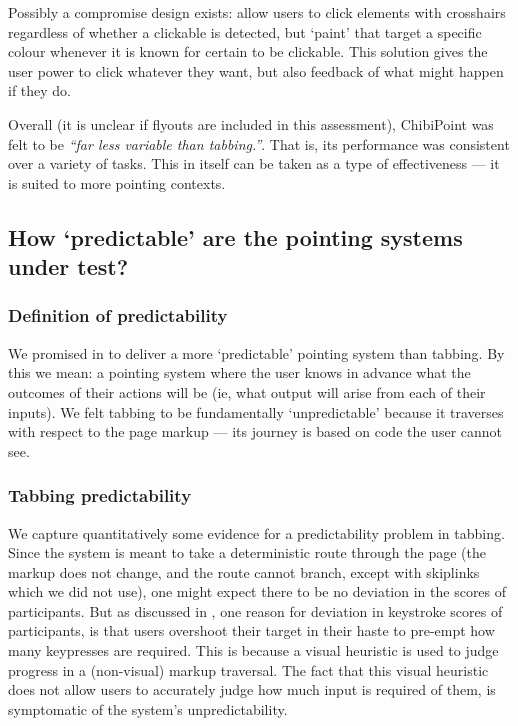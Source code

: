\documentclass[a4paper, 12pt]{report}
\begin{document}
Possibly a compromise design exists: allow users to click elements with crosshairs regardless of whether a clickable is detected, but `paint' that target a specific colour whenever it is known for certain to be clickable. This solution gives the user power to click whatever they want, but also feedback of what might happen if they do.

Overall (it is unclear if flyouts are included in this assessment), ChibiPoint was felt to be \textit{``far less variable than tabbing.''}. That is, its performance was consistent over a variety of tasks. This in itself can be taken as a type of effectiveness --- it is suited to more pointing contexts.

\subsection{How `predictable' are the pointing systems under test?}
\subsubsection{Definition of predictability}
We promised in  to deliver a more `predictable' pointing system than tabbing. By this we mean: a pointing system where the user knows in advance what the outcomes of their actions will be (ie, what output will arise from each of their inputs). We felt tabbing to be fundamentally `unpredictable' because it traverses with respect to the page markup --- its journey is based on code the user cannot see. 

\subsubsection{Tabbing predictability}
We capture quantitatively some evidence for a predictability problem in tabbing. Since the system is meant to take a deterministic route through the page (the markup does not change, and the route cannot branch, except with skiplinks which we did not use), one might expect there to be no deviation in the scores of participants. But as discussed in , one reason for deviation in keystroke scores of participants, is that users overshoot their target in their haste to pre-empt how many keypresses are required. This is because a visual heuristic is used to judge progress in a (non-visual) markup traversal. The fact that this visual heuristic does not allow users to accurately judge how much input is required of them, is symptomatic of the system's unpredictability.
\end{document}
